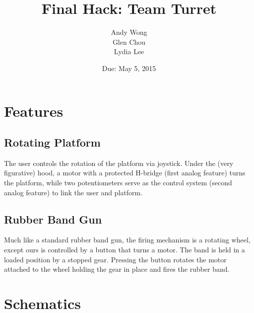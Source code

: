 \documentclass[a4paper, 11pt]{article}
\title{Final Hack: Team Turret}\author{Andy Wong\\Glen Chou\\Lydia Lee}\date{Due: May 5, 2015}
\begin{document}
\pagestyle{fancy}
\fancyhf{}
\maketitle
\tableofcontents

\newpage
\section{Features}
	\subsection{Rotating Platform}
		The user controls the rotation of the platform via joystick.  Under the (very figurative) hood, a motor with a protected H-bridge (first analog feature) turns the platform, while two potentiometers serve as the control system (second analog feature) to link the user and platform.  
	\subsection{Rubber Band Gun}
		Much like a standard rubber band gun, the firing mechanism is a rotating wheel, except ours is controlled by a button that turns a motor.  The band is held in a loaded position by a stopped gear.  Pressing the button rotates the motor attached to the wheel holding the gear in place and fires the rubber band.
\newpage
\section{Schematics}
\end{document}
